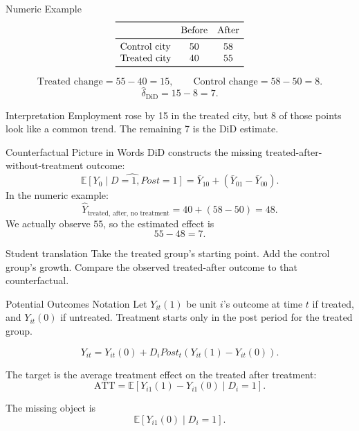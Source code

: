 \documentclass[11pt,aspectratio=169]{beamer}
\newcommand{\E}{\mathbb{E}}
\newcommand{\ATT}{\mathrm{ATT}}
\newcommand{\derivbutton}[1]{\vspace{0.4em}\hfill\hyperlink{app:#1}{\beamerbutton{Appendix details}}}
\begin{document}
\begin{frame}{Numeric Example}
  \[
  \begin{array}{lcc}
  \toprule
  & \text{Before} & \text{After} \\
  \midrule
  \text{Control city} & 50 & 58 \\
  \text{Treated city} & 40 & 55 \\
  \bottomrule
  \end{array}
  \]
  \vspace{0.4em}

  \[
    \text{Treated change}=55-40=15,
    \qquad
    \text{Control change}=58-50=8.
  \]
  \[
    \hat\delta_{\mathrm{DiD}}=15-8=7.
  \]
  \begin{block}{Interpretation}
    Employment rose by 15 in the treated city, but 8 of those points look like a common trend. The remaining 7 is the DiD estimate.
  \end{block}
\end{frame}

\begin{frame}{Counterfactual Picture in Words}
  DiD constructs the missing treated-after-without-treatment outcome:
  \[
    \widehat{\E[Y_{0}\mid D=1,Post=1]}
    =
    \bar Y_{10}
    +
    (\bar Y_{01}-\bar Y_{00}).
  \]
  \vspace{0.4em}
  In the numeric example:
  \[
    \widehat{Y}_{\text{treated, after, no treatment}}
    =
    40+(58-50)=48.
  \]
  We actually observe \(55\), so the estimated effect is
  \[
    55-48=7.
  \]
  \begin{block}{Student translation}
    Take the treated group's starting point. Add the control group's growth. Compare the observed treated-after outcome to that counterfactual.
  \end{block}
\end{frame}

\begin{frame}{Potential Outcomes Notation}
  \hypertarget{main:did-po}{}
  Let \(Y_{it}(1)\) be unit \(i\)'s outcome at time \(t\) if treated, and \(Y_{it}(0)\) if untreated.
  Treatment starts only in the post period for the treated group.

  \[
    Y_{it}=Y_{it}(0)+D_i Post_t\left(Y_{it}(1)-Y_{it}(0)\right).
  \]

  The target is the average treatment effect on the treated after treatment:
  \[
    \ATT
    =
    \E[Y_{i1}(1)-Y_{i1}(0)\mid D_i=1].
  \]

  The missing object is
  \[
    \E[Y_{i1}(0)\mid D_i=1].
  \]
  \derivbutton{did-identification}
\end{frame}
\end{document}
